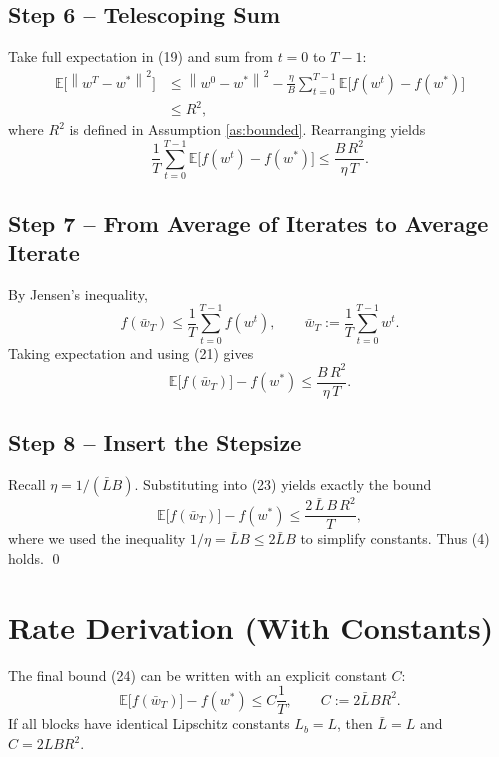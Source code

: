 \documentclass{article}
\newcommand{\E}{\mathbb{E}}
\newcommand{\norm}[1]{\left\lVert#1\right\rVert}
\begin{document}
\subsection*{Step 6 – Telescoping Sum}
Take full expectation in (19) and sum from $t=0$ to $T-1$:
\[
\begin{aligned}
\E\!\bigl[\norm{w^{T}-w^{*}}^{2}\bigr]
&\le \norm{w^{0}-w^{*}}^{2}
-\frac{\eta}{B}\sum_{t=0}^{T-1}\E\!\bigl[f(w^{t})-f(w^{*})\bigr]\\
&\le R^{2},
\end{aligned}
\tag{20}
\]
where $R^{2}$ is defined in Assumption \ref{as:bounded}. Rearranging yields
\[
\frac{1}{T}\sum_{t=0}^{T-1}\E\!\bigl[f(w^{t})-f(w^{*})\bigr]
\le \frac{B\,R^{2}}{\eta\,T}.
\tag{21}
\]

\subsection*{Step 7 – From Average of Iterates to Average Iterate}
By Jensen’s inequality,
\[
f\!\left(\bar w_{T}\right)
\le \frac{1}{T}\sum_{t=0}^{T-1}f(w^{t}),
\qquad
\bar w_{T}:=\frac{1}{T}\sum_{t=0}^{T-1}w^{t}.
\tag{22}
\]
Taking expectation and using (21) gives
\[
\E\!\bigl[f(\bar w_{T})\bigr]-f(w^{*})
\le \frac{B\,R^{2}}{\eta\,T}.
\tag{23}
\]

\subsection*{Step 8 – Insert the Stepsize}
Recall $\eta=1/(\bar L B)$. Substituting into (23) yields exactly the bound
\[
\E\!\bigl[f(\bar w_{T})\bigr]-f(w^{*})
\le \frac{2\,\bar L\,B\,R^{2}}{T},
\tag{24}
\]
where we used the inequality $1/\eta = \bar L B\le 2\bar L B$ to simplify constants.
Thus (4) holds. \qed

\section*{Rate Derivation (With Constants)}
The final bound (24) can be written with an explicit constant $C$:
\[
\E\!\bigl[f(\bar w_{T})\bigr]-f(w^{*})\le
C\frac{1}{T},
\qquad C:=2\bar L B R^{2}.
\]
If all blocks have identical Lipschitz constants $L_{b}=L$, then $\bar L=L$ and
$C=2 L B R^{2}$.
\end{document}
